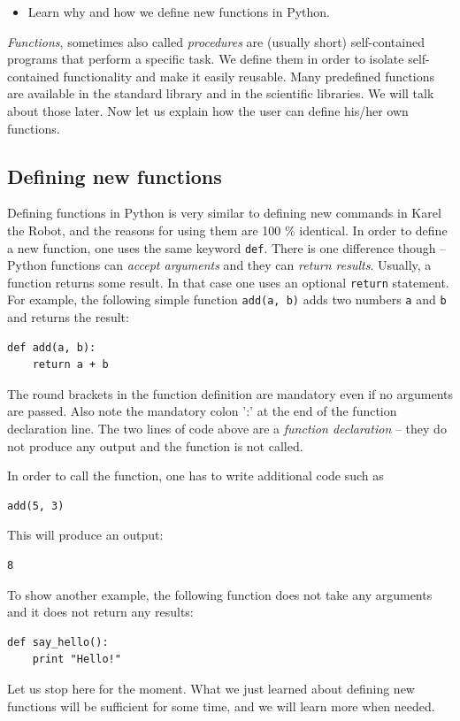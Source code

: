 \documentclass[article,A4,12pt]{llncs}
\begin{document}
\begin{itemize}
\item Learn why and how we define new functions in Python.
\end{itemize}
{\em Functions}, sometimes also called {\em procedures} are (usually short) self-contained programs that perform a specific task. 
We define them in order to isolate self-contained functionality and make it easily reusable.
Many predefined functions are available in the standard library and in the scientific libraries. 
We will talk about those later. Now let us explain how the user can define his/her own functions.

\subsection{Defining new functions}

Defining functions in Python is very similar to defining new commands 
in Karel the Robot, and the reasons for using them are 100 \% identical.
In order to define a new function, one uses the same keyword {\tt def}.
There is one difference though -- Python functions can {\em accept arguments} and 
they can {\em return results}. Usually, a function returns 
some result. In that case one uses an optional {\tt return} statement. For example, 
the following simple function {\tt add(a, b)} adds two numbers {\tt a} and {\tt b} 
and returns the result:

\begin{verbatim}
def add(a, b):
    return a + b
\end{verbatim}
The round brackets in the function definition are mandatory even if no arguments are passed.
Also note the mandatory colon ':' at the end of the function declaration line. The two lines of code above 
are a {\em function declaration} -- they do not produce any output and the function is not called. 

In order to call the function, one has to write additional code such as

\begin{verbatim}
add(5, 3)
\end{verbatim}
This will produce an output:

\begin{verbatim}
8
\end{verbatim}
To show another example, the following function does not take any arguments 
and it does not return any results:

\begin{verbatim}
def say_hello():
    print "Hello!"
\end{verbatim}
Let us stop here for the moment. What we just learned about defining new functions will be 
sufficient for some time, and we will learn more when needed.
\end{document}
